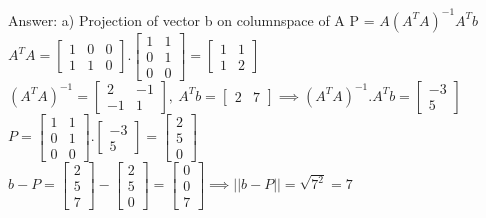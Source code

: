 \documentclass{article}%
\begin{document}
\begin{enumerate}
    Answer: a) Projection of vector b on columnspace of A P = $A(A^TA)^{-1}A^Tb$ \\
    $A^TA = \begin{bmatrix} 1 & 0 & 0 \\ 1 & 1 & 0 \end{bmatrix} . \begin{bmatrix} 1 & 1 \\ 0 & 1 \\ 0 & 0 \end{bmatrix} = \begin{bmatrix} 1 & 1 \\ 1 & 2 \end{bmatrix} $ \\
    $(A^TA)^{-1} = \begin{bmatrix} 2 & -1 \\ -1 & 1 \end{bmatrix}, \ A^Tb = \begin{bmatrix} 2 & 7 \end{bmatrix} \implies (A^TA)^{-1}.A^Tb = \begin{bmatrix} -3 \\ 5 \end{bmatrix} $ \\
    $P = \begin{bmatrix} 1 & 1 \\ 0 & 1 \\ 0 & 0 \end{bmatrix} . \begin{bmatrix} -3 \\ 5 \end{bmatrix} = \begin{bmatrix} 2 \\ 5 \\ 0 \end{bmatrix} $ \\
    $ b - P = \begin{bmatrix} 2 \\ 5 \\ 7 \end{bmatrix} - \begin{bmatrix} 2 \\ 5 \\ 0 \end{bmatrix} = \begin{bmatrix} 0 \\ 0 \\ 7 \end{bmatrix} \implies ||b - P|| = \sqrt{7^2} = 7$ \\ \\

\end{enumerate}
\end{document}

